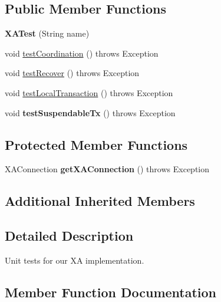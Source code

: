\subsection*{Public Member Functions}
\begin{DoxyCompactItemize}
\item 
\mbox{\label{classtestsuite_1_1simple_1_1_x_a_test_ab9bf087db2550571c63bb6f3d8dc31d9}} 
{\bfseries X\+A\+Test} (String name)
\item 
void \mbox{\hyperlink{classtestsuite_1_1simple_1_1_x_a_test_ac5d7e1565f556c03ca6ba2a11a6de5fa}{test\+Coordination}} ()  throws Exception 
\item 
void \mbox{\hyperlink{classtestsuite_1_1simple_1_1_x_a_test_aa3b48d0aaeb44cc191cba70d70e16234}{test\+Recover}} ()  throws Exception 
\item 
void \mbox{\hyperlink{classtestsuite_1_1simple_1_1_x_a_test_aeb2dc398d807c4028e784f85aba58457}{test\+Local\+Transaction}} ()  throws Exception 
\item 
\mbox{\label{classtestsuite_1_1simple_1_1_x_a_test_a81909386fefd2283e02aa376525f6fd7}} 
void {\bfseries test\+Suspendable\+Tx} ()  throws Exception 
\end{DoxyCompactItemize}
\subsection*{Protected Member Functions}
\begin{DoxyCompactItemize}
\item 
\mbox{\label{classtestsuite_1_1simple_1_1_x_a_test_ad6e5c8d3fc2f2bff1cbb0712db804ca8}} 
X\+A\+Connection {\bfseries get\+X\+A\+Connection} ()  throws Exception 
\end{DoxyCompactItemize}
\subsection*{Additional Inherited Members}


\subsection{Detailed Description}
Unit tests for our XA implementation. 

\subsection{Member Function Documentation}
\mbox{\label{classtestsuite_1_1simple_1_1_x_a_test_ac5d7e1565f556c03ca6ba2a11a6de5fa}} 
